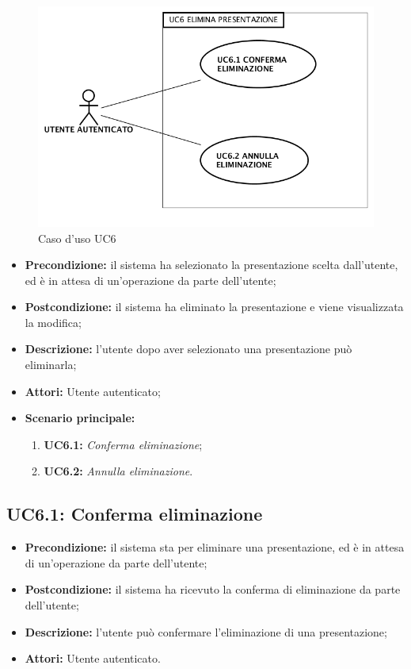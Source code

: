 \begin{figure}[H]
	\begin{center}
	\includegraphics[scale=0.4]{diagram/UC6.png}
	\caption{Caso d'uso UC6}
	\end{center}
\end{figure}
\begin{itemize}
	\item \textbf{Precondizione:} il sistema ha selezionato la presentazione scelta dall'utente, ed è in attesa di un'operazione da parte dell'utente;
	\item \textbf{Postcondizione:} il sistema ha eliminato la presentazione e viene visualizzata la modifica;
	\item \textbf{Descrizione:} l'utente dopo aver selezionato una presentazione può eliminarla;
	\item \textbf{Attori:} Utente autenticato;
	\item \textbf{Scenario principale:}
	\begin{enumerate}
		\item \textbf{ UC6.1:} \textit{ Conferma eliminazione};
		\item \textbf{ UC6.2:} \textit{ Annulla eliminazione}.
	\end{enumerate}
\end{itemize}
\subsection{ UC6.1: Conferma eliminazione}

\begin{itemize}
	\item \textbf{Precondizione:} il sistema sta per eliminare una presentazione, ed è in attesa di un'operazione da parte dell'utente;
	\item \textbf{Postcondizione:} il sistema ha ricevuto la conferma di eliminazione da parte dell'utente;
	\item \textbf{Descrizione:} l'utente può confermare l'eliminazione di una presentazione;
	\item \textbf{Attori:} Utente autenticato.
\end{itemize}
